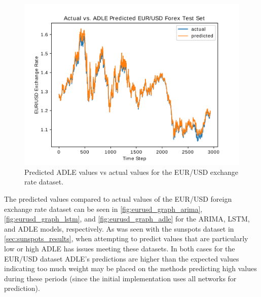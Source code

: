 \documentclass{article}
\begin{document}
\begin{figure}
	\centering
  \includegraphics[scale=0.28]{imgs/adle_results_eurusd.pdf}
  \caption{Predicted ADLE values vs actual values for the EUR/USD exchange rate dataset.}\label{fig:eurusd_graph_adle}
\endminipage
\end{figure}

The predicted values compared to actual values of the EUR/USD foreign exchange rate dataset can be seen in \autoref{fig:eurusd_graph_arima}, \autoref{fig:eurusd_graph_lstm}, and \autoref{fig:eurusd_graph_adle} for the ARIMA, LSTM, and ADLE models, respectively. As was seen with the sunspots dataset in \autoref{sec:sunspots_results}, when attempting to predict values that are particularly low or high ADLE has issues meeting these datasets. In both cases for the EUR/USD dataset ADLE's predictions are higher than the expected values indicating too much weight may be placed on the methods predicting high values during these periods (since the initial implementation uses all networks for prediction).
\end{document}
